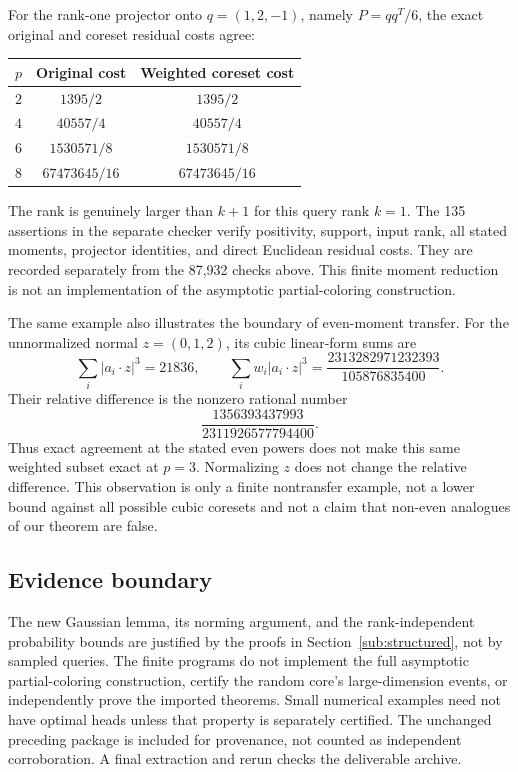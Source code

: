 \documentclass[11pt]{article}
\theoremstyle{remark}\newtheorem{remark}[theorem]{Remark}
\begin{document}
For the rank-one projector onto $q=(1,2,-1)$, namely $P=qq^T/6$, the exact original and coreset residual costs agree:
\begin{center}
\begin{tabular}{ccc}
\toprule
$p$ & Original cost & Weighted coreset cost\\
\midrule
$2$ & $1395/2$ & $1395/2$\\
$4$ & $40557/4$ & $40557/4$\\
$6$ & $1530571/8$ & $1530571/8$\\
$8$ & $67473645/16$ & $67473645/16$\\
\bottomrule
\end{tabular}
\end{center}
The rank is genuinely larger than $k+1$ for this query rank $k=1$. The 135 assertions in the separate checker verify positivity, support, input rank, all stated moments, projector identities, and direct Euclidean residual costs. They are recorded separately from the 87,932 checks above. This finite moment reduction is not an implementation of the asymptotic partial-coloring construction.

The same example also illustrates the boundary of even-moment transfer. For the unnormalized normal $z=(0,1,2)$, its cubic linear-form sums are
\[
 \sum_i|a_i\cdot z|^3=21836,\qquad
 \sum_iw_i|a_i\cdot z|^3=\frac{2313282971232393}{105876835400}.
\]
Their relative difference is the nonzero rational number
\[
 \frac{1356393437993}{2311926577794400}.
\]
Thus exact agreement at the stated even powers does not make this same weighted subset exact at $p=3$. Normalizing $z$ does not change the relative difference. This observation is only a finite nontransfer example, not a lower bound against all possible cubic coresets and not a claim that non-even analogues of our theorem are false.

\subsection{Evidence boundary}
The new Gaussian lemma, its norming argument, and the rank-independent probability bounds are justified by the proofs in Section~\ref{sub:structured}, not by sampled queries. The finite programs do not implement the full asymptotic partial-coloring construction, certify the random core's large-dimension events, or independently prove the imported theorems. Small numerical examples need not have optimal heads unless that property is separately certified. The unchanged preceding package is included for provenance, not counted as independent corroboration. A final extraction and rerun checks the deliverable archive.
\end{document}
